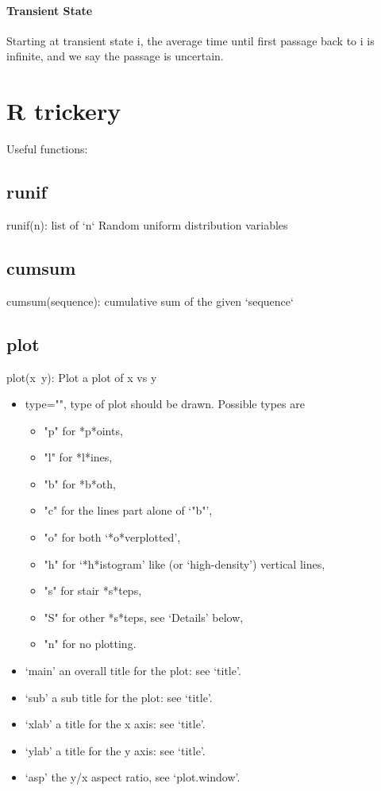 \documentclass[12pt]{article}
\begin{document}
    \paragraph{Transient State} Starting at transient state i, the average time until first passage back to i is infinite, and we say the passage is uncertain.
\section{R trickery}
Useful functions:
\subsection{runif}
runif(n): list of `n` Random uniform distribution variables
\subsection{cumsum} cumsum(sequence): cumulative sum of the given `sequence`
\subsection{plot} plot(x~y): Plot a plot of x vs y
\begin{itemize}
	\item type="", type of plot should be drawn.  Possible types are
		\begin{itemize}
			\item "p" for *p*oints,
			\item "l" for *l*ines,
			\item "b" for *b*oth,
			\item "c" for the lines part alone of ‘"b"’,
			\item "o" for both ‘*o*verplotted’,
			\item "h" for ‘*h*istogram’ like (or ‘high-density’) vertical lines,
			\item "s" for stair *s*teps,
			\item "S" for other *s*teps, see ‘Details’ below,
			\item "n" for no plotting.
		\end{itemize}
	\item ‘main’ an overall title for the plot: see ‘title’.
	\item ‘sub’ a sub title for the plot: see ‘title’.
	\item ‘xlab’ a title for the x axis: see ‘title’.
	\item ‘ylab’ a title for the y axis: see ‘title’.
	\item ‘asp’ the y/x aspect ratio, see ‘plot.window’.
\end{itemize}
\end{document}

